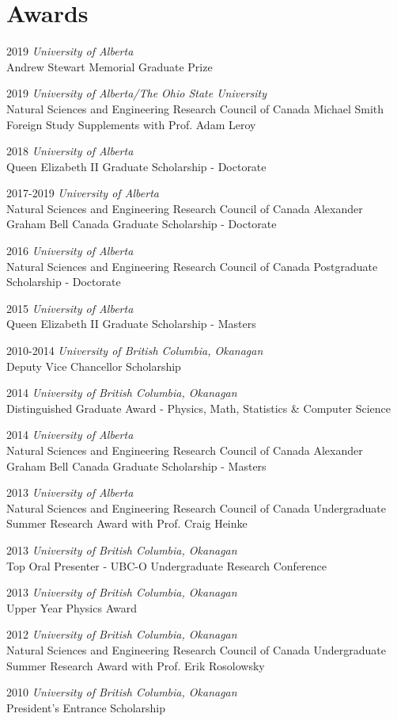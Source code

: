 \documentclass[letterpaper,11pt]{article}
\newlength{\mainindent} \setlength{\mainindent}{12pt}
\newlength{\contentindent} \setlength{\contentindent}{19ex}
\newenvironment{datelist}{
  \begingroup
  \raggedright
  \begin{description}[labelindent=\mainindent,leftmargin=\contentindent,
      style=sameline,font=\normalfont,topsep=0pt,partopsep=0pt,parsep=0pt,
      itemsep=4pt]
}{
  \end{description}
  \endgroup
}
\begin{document}
\section*{Awards}
\begin{datelist}
\item[2019] \emph{University of Alberta} \\ Andrew Stewart Memorial Graduate Prize
\item[2019] \emph{University of Alberta/The Ohio State University} \\ Natural Sciences and Engineering Research Council of Canada Michael Smith Foreign Study Supplements with Prof. Adam Leroy
\item[2018] \emph{University of Alberta} \\ Queen Elizabeth II Graduate Scholarship - Doctorate
\item[2017-2019] \emph{University of Alberta} \\ Natural Sciences and Engineering Research Council of Canada Alexander Graham Bell Canada Graduate Scholarship - Doctorate
\item[2016] \emph{University of Alberta} \\ Natural Sciences and Engineering Research Council of Canada Postgraduate Scholarship - Doctorate
\item[2015] \emph{University of Alberta} \\ Queen Elizabeth II Graduate Scholarship - Masters
\item[2010-2014] \emph{University of British Columbia, Okanagan} \\ Deputy Vice Chancellor Scholarship
\item[2014] \emph{University of British Columbia, Okanagan} \\ Distinguished Graduate Award - Physics, Math, Statistics \& Computer Science
\item[2014] \emph{University of Alberta} \\ Natural Sciences and Engineering Research Council of Canada Alexander Graham Bell Canada Graduate Scholarship - Masters
\item[2013] \emph{University of Alberta} \\ Natural Sciences and Engineering Research Council of Canada Undergraduate Summer Research Award with Prof. Craig Heinke
\item[2013] \emph{University of British Columbia, Okanagan} \\ Top Oral Presenter - UBC-O Undergraduate Research Conference
\item[2013] \emph{University of British Columbia, Okanagan} \\ Upper Year Physics Award
\item[2012] \emph{University of British Columbia, Okanagan} \\ Natural Sciences and Engineering Research Council of Canada Undergraduate Summer Research Award with Prof. Erik Rosolowsky
\item[2010] \emph{University of British Columbia, Okanagan} \\ President's Entrance Scholarship
\end{datelist}
\end{document}
